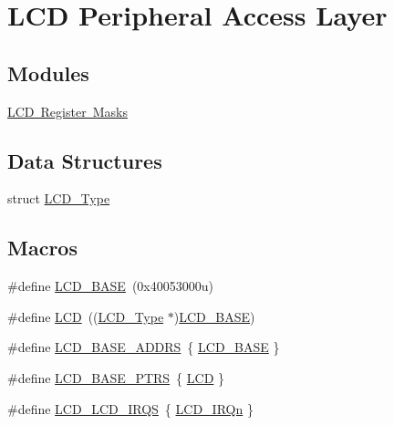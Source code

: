 \hypertarget{group___l_c_d___peripheral___access___layer}{}\section{L\+CD Peripheral Access Layer}
\label{group___l_c_d___peripheral___access___layer}
\subsection*{Modules}
\begin{DoxyCompactItemize}
\item 
\mbox{\hyperlink{group___l_c_d___register___masks}{L\+C\+D Register Masks}}
\end{DoxyCompactItemize}
\subsection*{Data Structures}
\begin{DoxyCompactItemize}
\item 
struct \mbox{\hyperlink{struct_l_c_d___type}{L\+C\+D\+\_\+\+Type}}
\end{DoxyCompactItemize}
\subsection*{Macros}
\begin{DoxyCompactItemize}
\item 
\#define \mbox{\hyperlink{group___l_c_d___peripheral___access___layer_ga017749aad23300240ef5ac4c3d5ca750}{L\+C\+D\+\_\+\+B\+A\+SE}}~(0x40053000u)
\item 
\#define \mbox{\hyperlink{group___l_c_d___peripheral___access___layer_gabf2d80992dcfabfd1668184c3dff2733}{L\+CD}}~((\mbox{\hyperlink{struct_l_c_d___type}{L\+C\+D\+\_\+\+Type}} $\ast$)\mbox{\hyperlink{group___l_c_d___peripheral___access___layer_ga017749aad23300240ef5ac4c3d5ca750}{L\+C\+D\+\_\+\+B\+A\+SE}})
\item 
\#define \mbox{\hyperlink{group___l_c_d___peripheral___access___layer_ga9043c1e52ca2c0f619f41dddd86c080d}{L\+C\+D\+\_\+\+B\+A\+S\+E\+\_\+\+A\+D\+D\+RS}}~\{ \mbox{\hyperlink{group___l_c_d___peripheral___access___layer_ga017749aad23300240ef5ac4c3d5ca750}{L\+C\+D\+\_\+\+B\+A\+SE}} \}
\item 
\#define \mbox{\hyperlink{group___l_c_d___peripheral___access___layer_gaad12448c57d0c01fa9ae38cd9216eae8}{L\+C\+D\+\_\+\+B\+A\+S\+E\+\_\+\+P\+T\+RS}}~\{ \mbox{\hyperlink{group___l_c_d___peripheral___access___layer_gabf2d80992dcfabfd1668184c3dff2733}{L\+CD}} \}
\item 
\#define \mbox{\hyperlink{group___l_c_d___peripheral___access___layer_gace1f0d7f12c2d06d48148889f08f3bc1}{L\+C\+D\+\_\+\+L\+C\+D\+\_\+\+I\+R\+QS}}~\{ \mbox{\hyperlink{group___interrupt__vector__numbers_gga666eb0caeb12ec0e281415592ae89083a161916b33cc34138d17e57eaa8464568}{L\+C\+D\+\_\+\+I\+R\+Qn}} \}
\end{DoxyCompactItemize}


